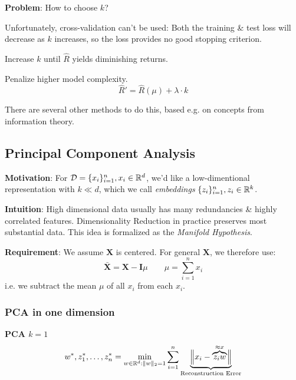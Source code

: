 \textbf{Problem}: How to choose $k$?

{\footnotesize
    \remark Unfortunately, cross-validation can't be used: Both the training \& test loss will decrease as $k$ increases, so the loss provides no good stopping criterion.
}

\method Increase $k$ until $\hat{R}$ yields diminishing returns.\\

\method Penalize higher model complexity.\\
$$
    \hat{R}' = \hat{R}(\mu) + \lambda\cdot k
$$

There are several other methods to do this, based e.g. on concepts from information theory.

\newpage

\subsection{Principal Component Analysis}

\textbf{Motivation}: For $\mathcal D = \{x_i\}_{i=1}^n,x_i\in\mathbb{R}^d$, we'd like a low-dimentional representation with $k \ll d$, which we call \textit{embeddings} $\{z_i\}_{i=1}^n, z_i\in\mathbb{R}^k$.\\

{\footnotesize
    \textbf{Intuition}: High dimensional data usually has many redundancies \& highly correlated features. Dimensionality Reduction in practice preserves most substantial data. This idea is formalized as the \textit{Manifold Hypothesis}.

    \remark \textbf{Requirement}: We assume $\mathbf{X}$ is centered. For general $\mathbf{X}$, we therefore use:
    $$
        \bar{\mathbf{X}} = \mathbf{X} - \mathbf{I}\mu \qquad \mu = \sum_{i=1}^{n}x_i
    $$
    i.e. we subtract the mean $\mu$ of all $x_i$ from each $x_i$.
}

\subsubsection{PCA in one dimension}

\method \textbf{PCA $k=1$}\\
$$
    w^*,z_1^*,\ldots,z_n^* = \underset{w\in\mathbb{R}^d : \Vert w\Vert_2 = 1}{\min}\sum_{i=1}^{n}\underbrace{\Bigl\Vert x_i-\overbrace{z_iw}^{\approx x} \Bigr\Vert}_\text{Reconstruction Error}
$$

